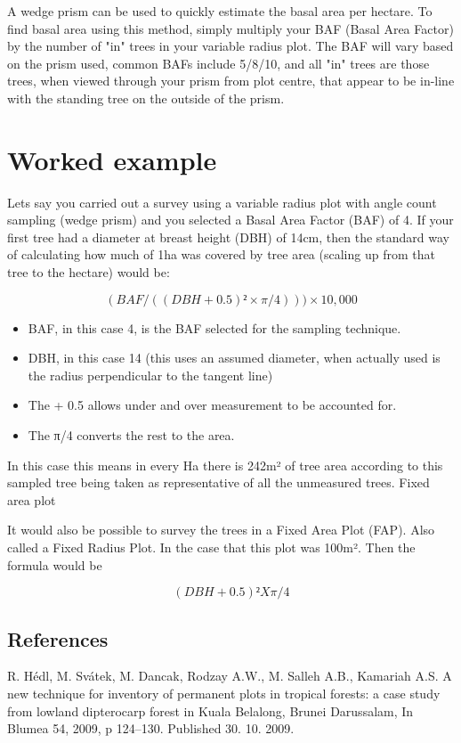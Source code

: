 A wedge prism can be used to quickly estimate the basal area per hectare. 
To find basal area using this method, simply multiply your BAF (Basal Area Factor) by the number of "in" trees in your variable radius plot. The BAF will vary based on the prism used, common BAFs include 5/8/10, and all "in" trees are those trees, when viewed through your prism from plot centre, that appear to be in-line with the standing tree on the outside of the prism.
\section{Worked example}

Lets say you carried out a survey using a variable radius plot with angle count sampling (wedge prism) and you selected a Basal Area Factor (BAF) of 4. If your first tree had a diameter at breast height (DBH) of 14cm, then the standard way of calculating how much of 1ha was covered by tree area (scaling up from that tree to the hectare) would be:

\[(BAF/((DBH+0.5)² × π/4))) × 10,000\]

\begin{itemize}
\item BAF, in this case 4, is the BAF selected for the sampling technique.
\item DBH, in this case 14 (this uses an assumed diameter, when actually used is the radius perpendicular to the tangent line)
\item The + 0.5 allows under and over measurement to be accounted for.
\item The π/4 converts the rest to the area.
\end{itemize}

In this case this means in every Ha there is 242m² of tree area according to this sampled tree being taken as representative of all the unmeasured trees.
Fixed area plot

It would also be possible to survey the trees in a Fixed Area Plot (FAP). Also called a Fixed Radius Plot. In the case that this plot was 100m². Then the formula would be

\[(DBH+0.5)²X π/4\]

\subsection*{References}

    R. Hédl, M. Svátek, M. Dancak, Rodzay A.W., M. Salleh A.B., Kamariah A.S. A new technique for inventory of permanent plots in tropical forests: a case study from lowland dipterocarp forest in Kuala Belalong, Brunei Darussalam, In Blumea 54, 2009, p 124–130. Published 30. 10. 2009.


